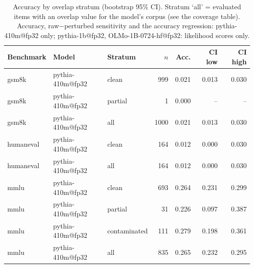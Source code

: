 \begin{table}[t]
\centering
\caption{Accuracy by overlap stratum (bootstrap 95\% CI). Stratum `all' = evaluated items with an overlap value for the model's corpus (see the coverage table). Accuracy, raw$-$perturbed sensitivity and the accuracy regression: pythia-410m@fp32 only; pythia-1b@fp32, OLMo-1B-0724-hf@fp32: likelihood scores only. }
\label{tab:strata_accuracy}
\begin{tabular}{lllrrrr}
\toprule
Benchmark & Model & Stratum & $n$ & Acc. & CI low & CI high \\
\midrule
gsm8k & pythia-410m@fp32 & clean & 999 & 0.021 & 0.013 & 0.030 \\
gsm8k & pythia-410m@fp32 & partial & 1 & 0.000 & -- & -- \\
gsm8k & pythia-410m@fp32 & all & 1000 & 0.021 & 0.013 & 0.030 \\
\midrule
humaneval & pythia-410m@fp32 & clean & 164 & 0.012 & 0.000 & 0.030 \\
humaneval & pythia-410m@fp32 & all & 164 & 0.012 & 0.000 & 0.030 \\
\midrule
mmlu & pythia-410m@fp32 & clean & 693 & 0.264 & 0.231 & 0.299 \\
mmlu & pythia-410m@fp32 & partial & 31 & 0.226 & 0.097 & 0.387 \\
mmlu & pythia-410m@fp32 & contaminated & 111 & 0.279 & 0.198 & 0.361 \\
mmlu & pythia-410m@fp32 & all & 835 & 0.265 & 0.232 & 0.295 \\
\bottomrule
\end{tabular}
\end{table}
